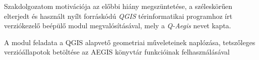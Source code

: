 Szakdolgozatom motivációja az előbbi hiány megszüntetése, a széleskörűen elterjedt és használt nyílt forráskódú \emph{QGIS} térinformatikai programhoz \cite{qgis} írt verziókezelő beépülő modul megvalósításával, mely a \emph{Q-Aegis} nevet kapta.

A modul feladata a QGIS alapvető geometriai műveleteinek naplózása, tetszőleges verzióállapotok betöltése az AEGIS könyvtár funkcióinak felhasználásával




